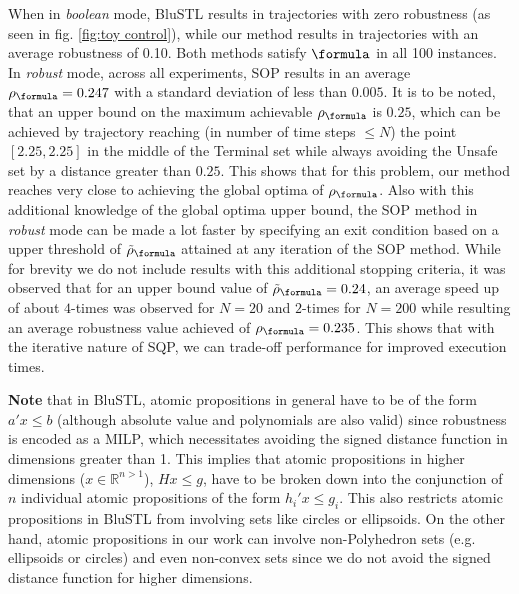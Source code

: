 \begin{exmp}
When in \textit{boolean} mode, BluSTL results in trajectories with zero robustness (as seen in fig. \ref{fig:toy control}), while our method results in trajectories with an average robustness of 0.10. Both methods satisfy $\formula$ in all 100 instances. In \textit{robust} mode, across all experiments, SOP results in an average $\rob_{\formula}=0.247$ with a standard deviation of less than $0.005$. It is to be noted, that an upper bound on the maximum achievable $\rob_{\formula}$ is $0.25$, which can be achieved by trajectory reaching (in number of time steps $\leq N$) the point $[2.25,2.25]$ in the middle of the Terminal set while always avoiding the Unsafe set by a distance greater than $0.25$. This shows that for this problem, our method reaches very close to achieving the global optima of $\rob_{\formula}$. Also with this additional knowledge of the global optima upper bound, the SOP method in \textit{robust} mode can be made a lot faster by specifying an exit condition based on a upper threshold of $\srob_{\formula}$ attained at any iteration of the SOP method. While for brevity we do not include results with this additional stopping criteria, it was observed that for an upper bound value of $\srob_{\formula}=0.24$, an average speed up of about $4$-times was observed for $N=20$ and $2$-times for $N=200$ while resulting an average robustness value achieved of $\rob_{\formula} = 0.235$. This shows that with the iterative nature of SQP, we can trade-off performance for improved execution times.

\textbf{Note} that in BluSTL, atomic propositions in general have to be of the form $a'x\leq b$ (although absolute value and polynomials are also valid) since robustness is encoded as a MILP, which necessitates avoiding the signed distance function in dimensions greater than 1. This implies that atomic propositions in higher dimensions ($x\in \mathbb{R}^{n>1}$), $Hx \leq g$, have to be broken down into the conjunction of $n$ individual atomic propositions of the form $h_i'x \leq g_i$. This also restricts atomic propositions in BluSTL from involving sets like circles or ellipsoids. On the other hand, atomic propositions in our work can involve non-Polyhedron sets (e.g. ellipsoids or circles) and even non-convex sets since we do not avoid the signed distance function for higher dimensions.


\end{exmp}
